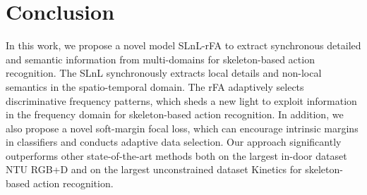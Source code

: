 \documentclass{article}
\begin{document}
\section{Conclusion}
In this work, we propose a novel model SLnL-rFA to extract synchronous detailed and semantic information from multi-domains for skeleton-based action recognition. The SLnL synchronously extracts local details and non-local semantics in the spatio-temporal domain. The rFA adaptively selects discriminative frequency patterns, which sheds a new light to exploit information in the frequency domain for skeleton-based action recognition. In addition, we also propose a novel soft-margin focal loss, which can encourage intrinsic margins in classifiers and  conducts adaptive data selection.  Our approach significantly outperforms other state-of-the-art methods both on the largest in-door dataset NTU RGB+D and on the largest unconstrained dataset Kinetics for skeleton-based action recognition.



\end{document}

